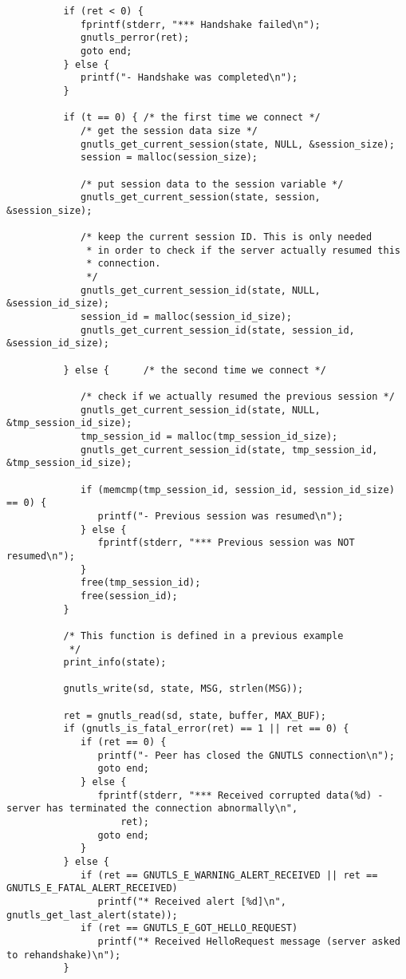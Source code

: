\begin{verbatim}
	      if (ret < 0) {
		     fprintf(stderr, "*** Handshake failed\n");
		     gnutls_perror(ret);
		     goto end;
	      } else {
		     printf("- Handshake was completed\n");
	      }

	      if (t == 0) {	/* the first time we connect */
		     /* get the session data size */
		     gnutls_get_current_session(state, NULL, &session_size);
		     session = malloc(session_size);

		     /* put session data to the session variable */
		     gnutls_get_current_session(state, session, &session_size);

		     /* keep the current session ID. This is only needed
		      * in order to check if the server actually resumed this
		      * connection.
		      */
		     gnutls_get_current_session_id(state, NULL, &session_id_size);
		     session_id = malloc(session_id_size);
		     gnutls_get_current_session_id(state, session_id, &session_id_size);

	      } else {		/* the second time we connect */

		     /* check if we actually resumed the previous session */
		     gnutls_get_current_session_id(state, NULL, &tmp_session_id_size);
		     tmp_session_id = malloc(tmp_session_id_size);
		     gnutls_get_current_session_id(state, tmp_session_id, &tmp_session_id_size);

		     if (memcmp(tmp_session_id, session_id, session_id_size) == 0) {
			    printf("- Previous session was resumed\n");
		     } else {
			    fprintf(stderr, "*** Previous session was NOT resumed\n");
		     }
		     free(tmp_session_id);
		     free(session_id);
	      }

	      /* This function is defined in a previous example
	       */
	      print_info(state);

	      gnutls_write(sd, state, MSG, strlen(MSG));

	      ret = gnutls_read(sd, state, buffer, MAX_BUF);
	      if (gnutls_is_fatal_error(ret) == 1 || ret == 0) {
		     if (ret == 0) {
			    printf("- Peer has closed the GNUTLS connection\n");
			    goto end;
		     } else {
			    fprintf(stderr, "*** Received corrupted data(%d) - server has terminated the connection abnormally\n",
				    ret);
			    goto end;
		     }
	      } else {
		     if (ret == GNUTLS_E_WARNING_ALERT_RECEIVED || ret == GNUTLS_E_FATAL_ALERT_RECEIVED)
			    printf("* Received alert [%d]\n", gnutls_get_last_alert(state));
		     if (ret == GNUTLS_E_GOT_HELLO_REQUEST)
			    printf("* Received HelloRequest message (server asked to rehandshake)\n");
	      }


\end{verbatim}
